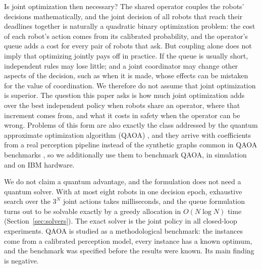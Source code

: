 \documentclass[a4paper,fleqn]{cas-dc}
\begin{document}
Is joint optimization then necessary? The shared operator couples the robots' decisions mathematically, and the joint decision of all robots that reach their deadlines together is naturally a quadratic binary optimization problem: the cost of each robot's action comes from its calibrated probability, and the operator's queue adds a cost for every pair of robots that ask. But coupling alone does not imply that optimizing jointly pays off in practice. If the queue is usually short, independent rules may lose little; and a joint coordinator may change other aspects of the decision, such as when it is made, whose effects can be mistaken for the value of coordination. We therefore do not assume that joint optimization is superior. The question this paper asks is how much joint optimization adds over the best independent policy when robots share an operator, where that increment comes from, and what it costs in safety when the operator can be wrong. Problems of this form are also exactly the class addressed by the quantum approximate optimization algorithm (QAOA) \citep{farhi2014qaoa}, and they arrive with coefficients from a real perception pipeline instead of the synthetic graphs common in QAOA benchmarks \citep{abbas2024challenges}, so we additionally use them to benchmark QAOA, in simulation and on IBM hardware.

We do not claim a quantum advantage, and the formulation does not need a quantum solver. With at most eight robots in one decision epoch, exhaustive search over the $3^N$ joint actions takes milliseconds, and the queue formulation turns out to be solvable exactly by a greedy allocation in $O(N\log N)$ time (Section~\ref{sec:solvers}). The exact solver is the joint policy in all closed-loop experiments. QAOA is studied as a methodological benchmark: the instances come from a calibrated perception model, every instance has a known optimum, and the benchmark was specified before the results were known. Its main finding is negative.
\end{document}

